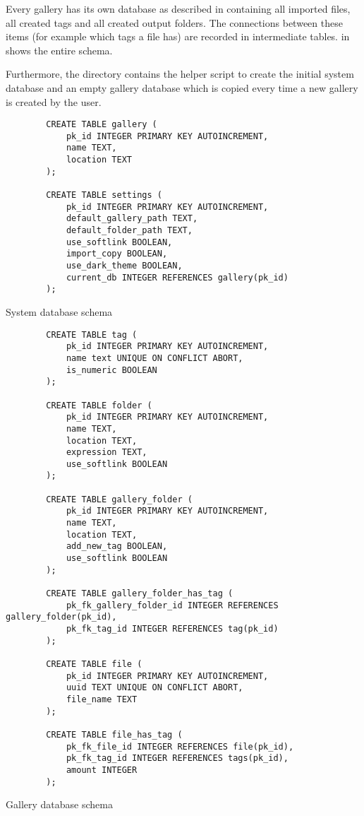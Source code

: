 Every gallery has its own database as described in 
containing all imported files, all created tags and all created output folders.
The connections between these items (for example which tags a file has) are
recorded in intermediate tables.  in
 shows the entire schema.

Furthermore, the directory contains the helper script  to
create the initial system database and an empty gallery database which is
copied every time a new gallery is created by the user.

\begin{listing}[!ht]
	\begin{verbatim}
		CREATE TABLE gallery (
			pk_id INTEGER PRIMARY KEY AUTOINCREMENT,
			name TEXT,
			location TEXT
		);

		CREATE TABLE settings (
			pk_id INTEGER PRIMARY KEY AUTOINCREMENT,
			default_gallery_path TEXT,
			default_folder_path TEXT,
			use_softlink BOOLEAN,
			import_copy BOOLEAN,
			use_dark_theme BOOLEAN,
			current_db INTEGER REFERENCES gallery(pk_id)
		);
	\end{verbatim}
	\caption{System database schema}
	\label{lst:db:system}
\end{listing}

\begin{listing}[!ht]
	\begin{verbatim}
		CREATE TABLE tag (
			pk_id INTEGER PRIMARY KEY AUTOINCREMENT,
			name text UNIQUE ON CONFLICT ABORT,
			is_numeric BOOLEAN
		);

		CREATE TABLE folder (
			pk_id INTEGER PRIMARY KEY AUTOINCREMENT,
			name TEXT,
			location TEXT,
			expression TEXT,
			use_softlink BOOLEAN
		);

		CREATE TABLE gallery_folder (
			pk_id INTEGER PRIMARY KEY AUTOINCREMENT,
			name TEXT,
			location TEXT,
			add_new_tag BOOLEAN,
			use_softlink BOOLEAN
		);

		CREATE TABLE gallery_folder_has_tag (
			pk_fk_gallery_folder_id INTEGER REFERENCES gallery_folder(pk_id),
			pk_fk_tag_id INTEGER REFERENCES tag(pk_id)
		);

		CREATE TABLE file (
			pk_id INTEGER PRIMARY KEY AUTOINCREMENT,
			uuid TEXT UNIQUE ON CONFLICT ABORT,
			file_name TEXT
		);

		CREATE TABLE file_has_tag (
			pk_fk_file_id INTEGER REFERENCES file(pk_id),
			pk_fk_tag_id INTEGER REFERENCES tags(pk_id),
			amount INTEGER
		);
	\end{verbatim}
	\caption{Gallery database schema}
	\label{lst:db:gallery}
\end{listing}

